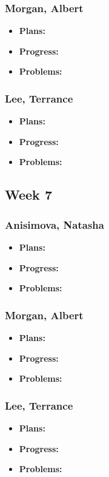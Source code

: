 \documentclass[10pt,draftclsnofoot,onecolumn]{IEEEtran}
\begin{document}
\subsubsection{Morgan, Albert}
\begin{itemize}
	\item \textbf{Plans:}
	\item \textbf{Progress:}
	\item \textbf{Problems:}
\end{itemize}
\subsubsection{Lee, Terrance}
\begin{itemize}
	\item \textbf{Plans:}
	\item \textbf{Progress:}
	\item \textbf{Problems:}
\end{itemize}
\subsection{Week 7}
\subsubsection{Anisimova, Natasha}
\begin{itemize}
	\item \textbf{Plans:}
	\item \textbf{Progress:}
	\item \textbf{Problems:}
\end{itemize}
\subsubsection{Morgan, Albert}
\begin{itemize}
	\item \textbf{Plans:}
	\item \textbf{Progress:}
	\item \textbf{Problems:}
\end{itemize}
\subsubsection{Lee, Terrance}
\begin{itemize}
	\item \textbf{Plans:}
	\item \textbf{Progress:}
	\item \textbf{Problems:}
\end{itemize}
\end{document}
